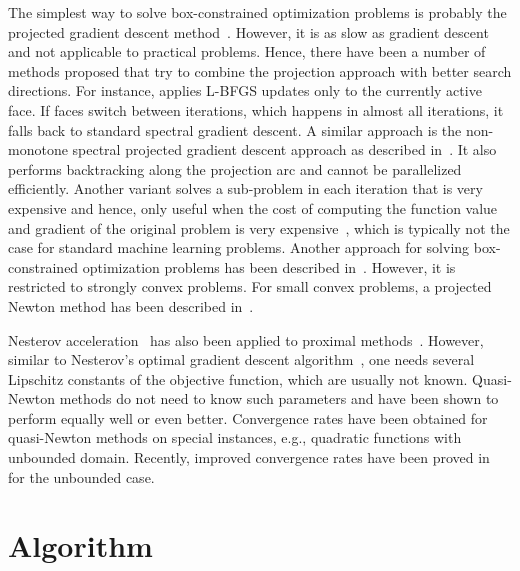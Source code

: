 \documentclass[letterpaper]{article} %
\newcommand{\ignore}[1]{}
\begin{document}
The simplest way to solve box-constrained optimization problems is probably the projected gradient descent method~\cite{Nesterov04}. However, it is as slow as gradient descent and not applicable to practical problems. Hence, there have been a number of methods proposed that try to combine the projection approach with better search directions. For instance, \cite{Berg20} applies L-BFGS updates only to the currently active face. If faces switch between iterations, which happens in almost all iterations, it falls back to standard spectral gradient descent. A similar approach is the non-monotone spectral projected gradient descent approach as described in~\cite{SchmidtKS11}. It also performs backtracking along the projection arc and cannot be parallelized efficiently. Another variant solves a sub-problem in each iteration that is very expensive and hence, only useful when the cost of computing the function value and gradient of the original problem is very expensive~\cite{SchmidtBFM09}, which is typically not the case for standard machine learning problems. Another approach for solving box-constrained optimization problems has been described in~\cite{KimSD10}. However, it is restricted to strongly convex problems. For small convex problems, a projected Newton method has been described in~\cite{Bertsekas82}.

Nesterov acceleration~\cite{Nesterov83} has also been applied to proximal methods~\cite{BeckT09, LiL15}. However, similar to Nesterov's optimal gradient descent algorithm~\cite{Nesterov83}, one needs several Lipschitz constants of the objective function, which are usually not known. Quasi-Newton methods do not need to know such parameters and have been shown to perform equally well or even better. 
Convergence rates have been obtained for quasi-Newton methods on special instances, e.g., quadratic functions with unbounded domain. Recently, improved convergence rates have been proved in~\cite{RodomanovN21} for the unbounded case.

\section{Algorithm} \label{sec:algo}

\ignore{
Here, we present our extension of the L-BFGS algorithm that can additionally handle box constraints and %
runs efficiently on the GPU. In the algorithm and its analysis we are using the following notation. 
}
\end{document}
